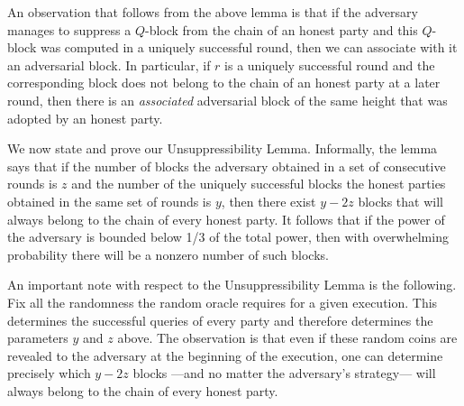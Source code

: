 An observation that follows from the above lemma is that if
the adversary manages to suppress a $Q$-block from the chain of an honest party
and this $Q$-block was computed in a uniquely successful round,
then we can associate with it an adversarial block.
In particular, if $r$ is a uniquely successful round and the corresponding
block does not belong to the chain of an honest party at a later round, then
there is an \emph{associated} adversarial block of the same height that was
adopted by an honest party.

We now state and prove our Unsuppressibility Lemma. Informally, the lemma says that if the
number of blocks the adversary obtained in a set of consecutive rounds is $z$
and the number of the uniquely successful blocks the honest parties obtained
in the same set of rounds is $y$, then there exist $y-2z$ blocks that will
always belong to the chain of every honest party.
It follows that if the power of the adversary is bounded below 1/3 of the
total power, then with overwhelming probability there will be a nonzero number of such
blocks.

An important note with respect to the Unsuppressibility Lemma is the following.
Fix all the randomness the random oracle requires for a given execution.
This determines the successful queries of every party and therefore determines
the parameters $y$ and $z$ above. The observation is that even if these
random coins are revealed to the adversary at the beginning of the execution,
one can determine precisely which $y-2z$ blocks ---and no matter the
adversary's strategy--- will always belong to the chain of every honest party.

